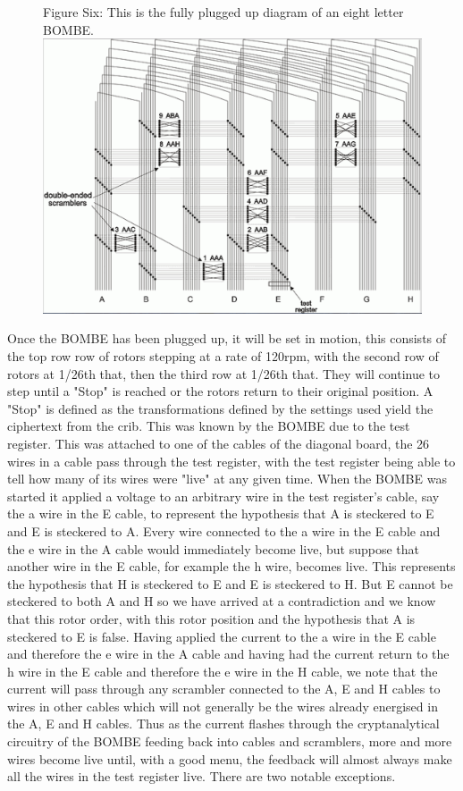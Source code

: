 \documentclass[12pt,a4paper]{article}
\begin{document}
\begin{figure}[h]
\centering
Figure Six: 
This is the fully plugged up diagram of an eight letter BOMBE.
\includegraphics[width=\textwidth]{BOMBEthree.png}
\end{figure}

Once the BOMBE has been plugged up, it will be set in motion, this consists of the top row row of rotors stepping at a rate of 120rpm, with the second row of rotors at 1/26th that, then the third row at 1/26th that. They will continue to step until a "Stop" is reached or the rotors return to their original position. A "Stop" is defined as the transformations defined by the settings used yield the ciphertext from the crib. This was known by the BOMBE due to the test register. This was attached to one of the cables of the diagonal board, the 26 wires in a cable pass through the test register, with the test register being able to tell how many of its wires were "live" at any given time. When the BOMBE was started it applied a voltage to an arbitrary wire in the test register's cable, say the a wire in the E cable, to represent the hypothesis that A is steckered to E and E is steckered to A. Every wire connected to the a wire in the E cable and the e wire in the A cable would immediately become live, but suppose that another wire in the E cable, for example the h wire, becomes live. This represents the hypothesis that H is steckered to E and E is steckered to H. But E cannot be steckered to both A and H so we have arrived at a contradiction and we know that this rotor order, with this rotor position and the hypothesis that A is steckered to E is false. Having applied the current to the a wire in the E cable and therefore the e wire in the A cable and having had the current return to the h wire in the E cable and therefore the e wire in the H cable, we note that the current will pass through any scrambler connected to the A, E and H cables to wires in other cables which will not generally be the wires already energised in the A, E and H cables. Thus as the current flashes through the cryptanalytical circuitry of the BOMBE feeding back into cables and scramblers, more and more wires become live until, with a good menu, the feedback will almost always make all the wires in the test register live. There are two notable exceptions.
\end{document}
